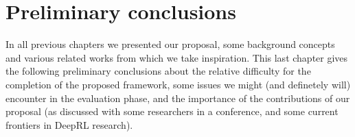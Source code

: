 
\chapter{Preliminary conclusions}
\label{ch:discussion}

In all previous chapters we presented our proposal, some background concepts
and various related works from which we take inspiration. This last chapter
gives the following preliminary conclusions about the relative difficulty for
the completion of the proposed framework, some issues we might (and definetely will)
encounter in the evaluation phase, and the importance of the contributions of
our proposal (as discussed with some researchers in a conference, and some current
frontiers in DeepRL research).


